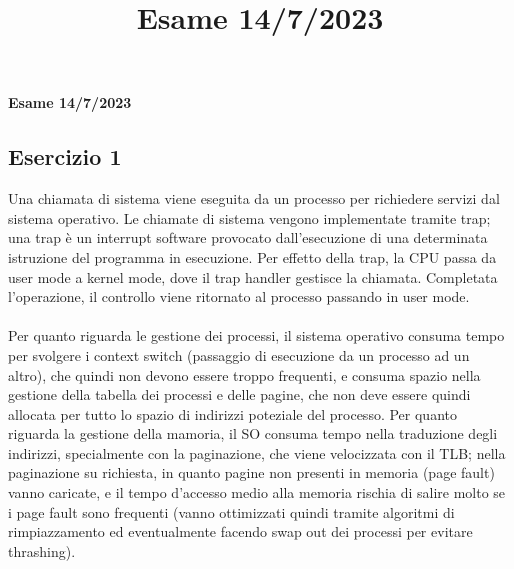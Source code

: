 \documentclass[12pt]{article}
\title{Esame 14/7/2023}
\begin{document}
\begin{center}
    \large\textbf{Esame 14/7/2023}
\end{center}
\subsection*{Esercizio 1}
Una chiamata di sistema viene eseguita da un processo per richiedere servizi dal sistema operativo. Le chiamate di sistema 
vengono implementate tramite trap; una trap è un interrupt software provocato dall'esecuzione di una determinata istruzione 
del programma in esecuzione. Per effetto della trap, la CPU passa da user mode a kernel mode, dove il trap handler gestisce 
la chiamata. Completata l'operazione, il controllo viene ritornato al processo passando in user mode.\\\\
Per quanto riguarda le gestione dei processi, il sistema operativo consuma tempo per svolgere i context switch (passaggio 
di esecuzione da un processo ad un altro), che quindi non devono essere troppo frequenti, e consuma spazio nella gestione 
della tabella dei processi e delle pagine, che non deve essere quindi allocata per tutto lo spazio di indirizzi poteziale 
del processo. Per quanto riguarda la gestione della mamoria, il SO consuma tempo nella traduzione degli indirizzi, 
specialmente con la paginazione, che viene velocizzata con il TLB; nella paginazione su richiesta, in quanto pagine non 
presenti in memoria (page fault) vanno caricate, e il tempo d'accesso medio alla memoria rischia di salire molto se i 
page fault sono frequenti (vanno ottimizzati quindi tramite algoritmi di rimpiazzamento ed eventualmente facendo swap 
out dei processi per evitare thrashing).
\end{document}
